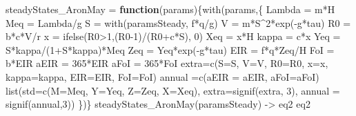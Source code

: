\documentclass[
]{book}
\newenvironment{Shaded}{\begin{snugshade}}{\end{snugshade}}
\newcommand{\AttributeTok}[1]{\textcolor[rgb]{0.77,0.63,0.00}{#1}}
\newcommand{\ControlFlowTok}[1]{\textcolor[rgb]{0.13,0.29,0.53}{\textbf{#1}}}
\newcommand{\DecValTok}[1]{\textcolor[rgb]{0.00,0.00,0.81}{#1}}
\newcommand{\FunctionTok}[1]{\textcolor[rgb]{0.00,0.00,0.00}{#1}}
\newcommand{\NormalTok}[1]{#1}
\newcommand{\OtherTok}[1]{\textcolor[rgb]{0.56,0.35,0.01}{#1}}
\newcommand{\SpecialCharTok}[1]{\textcolor[rgb]{0.00,0.00,0.00}{#1}}
\begin{document}
\begin{Shaded}
\begin{Highlighting}[]
\NormalTok{steadyStates\_AronMay }\OtherTok{=} \ControlFlowTok{function}\NormalTok{(params)\{}\FunctionTok{with}\NormalTok{(params,\{}
\NormalTok{  Lambda }\OtherTok{=}\NormalTok{ m}\SpecialCharTok{*}\NormalTok{H}
\NormalTok{  Meq }\OtherTok{=}\NormalTok{ Lambda}\SpecialCharTok{/}\NormalTok{g}
\NormalTok{  S }\OtherTok{=} \FunctionTok{with}\NormalTok{(paramsSteady, f}\SpecialCharTok{*}\NormalTok{q}\SpecialCharTok{/}\NormalTok{g)}
\NormalTok{  V }\OtherTok{=}\NormalTok{ m}\SpecialCharTok{*}\NormalTok{S}\SpecialCharTok{\^{}}\DecValTok{2}\SpecialCharTok{*}\FunctionTok{exp}\NormalTok{(}\SpecialCharTok{{-}}\NormalTok{g}\SpecialCharTok{*}\NormalTok{tau)}
\NormalTok{  R0 }\OtherTok{=}\NormalTok{ b}\SpecialCharTok{*}\NormalTok{c}\SpecialCharTok{*}\NormalTok{V}\SpecialCharTok{/}\NormalTok{r}
\NormalTok{  x }\OtherTok{=} \FunctionTok{ifelse}\NormalTok{(R0}\SpecialCharTok{\textgreater{}}\DecValTok{1}\NormalTok{,(R0}\DecValTok{{-}1}\NormalTok{)}\SpecialCharTok{/}\NormalTok{(R0}\SpecialCharTok{+}\NormalTok{c}\SpecialCharTok{*}\NormalTok{S), }\DecValTok{0}\NormalTok{) }
\NormalTok{  Xeq }\OtherTok{=}\NormalTok{ x}\SpecialCharTok{*}\NormalTok{H}
\NormalTok{  kappa }\OtherTok{=}\NormalTok{ c}\SpecialCharTok{*}\NormalTok{x}
\NormalTok{  Yeq }\OtherTok{=}\NormalTok{ S}\SpecialCharTok{*}\NormalTok{kappa}\SpecialCharTok{/}\NormalTok{(}\DecValTok{1}\SpecialCharTok{+}\NormalTok{S}\SpecialCharTok{*}\NormalTok{kappa)}\SpecialCharTok{*}\NormalTok{Meq }
\NormalTok{  Zeq }\OtherTok{=}\NormalTok{ Yeq}\SpecialCharTok{*}\FunctionTok{exp}\NormalTok{(}\SpecialCharTok{{-}}\NormalTok{g}\SpecialCharTok{*}\NormalTok{tau) }
\NormalTok{  EIR }\OtherTok{=}\NormalTok{ f}\SpecialCharTok{*}\NormalTok{q}\SpecialCharTok{*}\NormalTok{Zeq}\SpecialCharTok{/}\NormalTok{H}
\NormalTok{  FoI }\OtherTok{=}\NormalTok{ b}\SpecialCharTok{*}\NormalTok{EIR}
\NormalTok{  aEIR }\OtherTok{=} \DecValTok{365}\SpecialCharTok{*}\NormalTok{EIR }
\NormalTok{  aFoI }\OtherTok{=} \DecValTok{365}\SpecialCharTok{*}\NormalTok{FoI }
\NormalTok{  extra}\OtherTok{=}\FunctionTok{c}\NormalTok{(}\AttributeTok{S=}\NormalTok{S, }\AttributeTok{V=}\NormalTok{V, }\AttributeTok{R0=}\NormalTok{R0, }\AttributeTok{x=}\NormalTok{x, }\AttributeTok{kappa=}\NormalTok{kappa, }
          \AttributeTok{EIR=}\NormalTok{EIR, }\AttributeTok{FoI=}\NormalTok{FoI)}
\NormalTok{  annual }\OtherTok{=}\FunctionTok{c}\NormalTok{(}\AttributeTok{aEIR =}\NormalTok{ aEIR, }\AttributeTok{aFoI=}\NormalTok{aFoI)}
  \FunctionTok{list}\NormalTok{(}\AttributeTok{std=}\FunctionTok{c}\NormalTok{(}\AttributeTok{M=}\NormalTok{Meq, }\AttributeTok{Y=}\NormalTok{Yeq, }\AttributeTok{Z=}\NormalTok{Zeq, }\AttributeTok{X=}\NormalTok{Xeq), }
       \AttributeTok{extra=}\FunctionTok{signif}\NormalTok{(extra, }\DecValTok{3}\NormalTok{),}
       \AttributeTok{annual =} \FunctionTok{signif}\NormalTok{(annual,}\DecValTok{3}\NormalTok{)) }
\NormalTok{\})\}}
\FunctionTok{steadyStates\_AronMay}\NormalTok{(paramsSteady) }\OtherTok{{-}\textgreater{}}\NormalTok{ eq2}
\NormalTok{eq2}
\end{Highlighting}
\end{Shaded}
\end{document}
